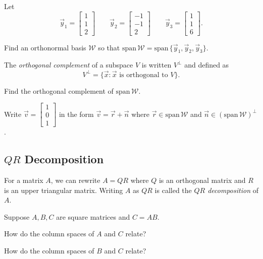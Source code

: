 \documentclass{problemset}
\renewcommand{\span}{\mathrm{span}\,}
\newcommand{\mat}[1]{\begin{bmatrix}#1\end{bmatrix}}
\begin{document}
	\question
	Let
	\[
		\vec y_1=\mat{1\\1\\2}\qquad 
		\vec y_2=\mat{-1\\-1\\2}\qquad
		\vec y_3=\mat{1\\1\\6}.
	\]
	\begin{parts}
		\item Find an orthonormal basis $\mathcal W$ so that $\span\mathcal W=
			\span\{\vec y_1,\vec y_2,\vec y_3\}$.
	\end{parts}

	\begin{definition}
		The \emph{orthogonal complement} of a subspace $V$ is written
		$V^\perp$ and defined as
		\[
			V^\perp=\{\vec x:\vec x\text{ is orthogonal to }V\}.
		\]
		\vspace{-.2in}
	\end{definition}

	\begin{parts}[resume]
		\item Find the orthogonal complement of $\span \mathcal W$.
		\item Write $\vec v=\mat{1\\0\\1}$ in the form $\vec v=\vec r+\vec n$ where 
			$\vec r\in\span\mathcal W$ and $\vec n\in(\span \mathcal W)^\perp$.
	\end{parts}


\subsection*{$QR$ Decomposition}

	\begin{definition}[$QR$ Decomposition]
		For a matrix $A$, we can rewrite $A=QR$ where $Q$ is an
		orthogonal matrix and $R$ is an upper triangular matrix.  Writing
		$A$ as $QR$ is called the \emph{$QR$ decomposition} of $A$.
	\end{definition}

	\question
	Suppose $A,B,C$ are square matrices and $C=AB$.
	\begin{parts}
		\item How do the column spaces of $A$ and $C$ relate?
		\item How do the column spaces of $B$ and $C$ relate?
	\end{parts}
\end{document}
